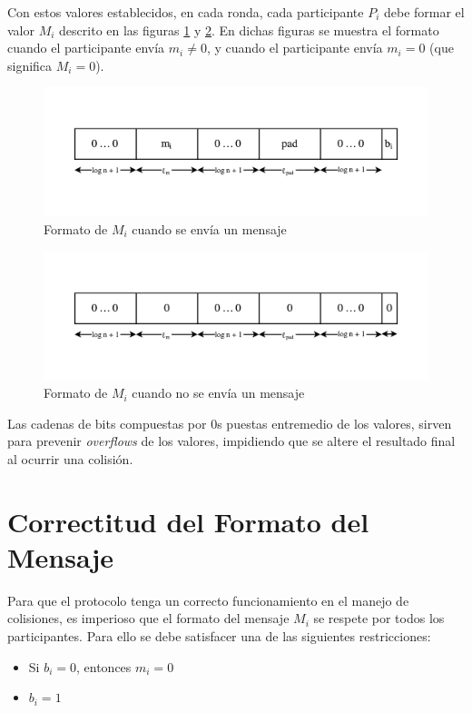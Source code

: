 Con estos valores establecidos, en cada ronda, cada participante $P_i$ debe 
formar el valor $M_i$ descrito en las figuras \ref{fig:M_sending} y 
\ref{fig:M_not_sending}. En dichas figuras se muestra el formato cuando 
el participante envía $m_i \neq 0$, y cuando el participante envía 
$m_i = 0$ (que significa $M_i = 0$).

\begin{figure}[H]
  \centering
    \includegraphics[width=1\textwidth]{imagenes/message-format(1).pdf}
  \caption{Formato de $M_i$ cuando se envía un mensaje}
  \label{fig:M_sending}
\end{figure}

\begin{figure}[H]
  \centering
    \includegraphics[width=1\textwidth]{imagenes/message-format-nomessage.pdf}
  \caption{Formato de $M_i$ cuando no se envía un mensaje}
  \label{fig:M_not_sending}
\end{figure}

Las cadenas de bits compuestas por 0s puestas entremedio de los valores, 
sirven para prevenir \emph{overflows} de los valores, impidiendo que se altere 
el resultado final al ocurrir una colisión.

\section{Correctitud del Formato del Mensaje}

Para que el protocolo tenga un correcto funcionamiento en el manejo de 
colisiones, es imperioso que el formato del mensaje $M_i$ se respete por todos 
los participantes. Para ello se debe satisfacer una de las siguientes 
restricciones:
\begin{itemize}
    \item Si $b_i = 0$, entonces $m_i = 0$
    \item $b_i = 1$
\end{itemize}

